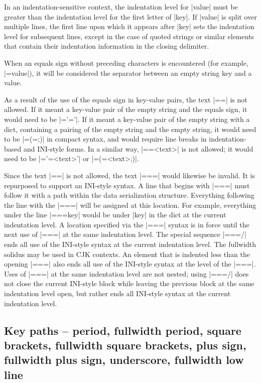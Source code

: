 \documentclass[11pt]{article}
\begin{document}
In an indentation-sensitive context, the indentation level for |value| must be greater than the indentation level for the first letter of |key|.  If |value| is split over multiple lines, the first line upon which it appears after |key| sets the indentation level for subsequent lines, except in the case of quoted strings or similar elements that contain their indentation information in the closing delimiter.

When an equals sign without preceding characters is encountered (for example, |=value|), it will be considered the separator between an empty string key and a value.  

As a result of the use of the equals sign in key-value pairs, the text |==| is not allowed.  If it meant a key-value pair of the empty string and the equals sign, it would need to be |='='|.  If it meant a key-value pair of the empty string with a dict, containing a pairing of the empty string and the empty string, it would need to be |=(=;)| in compact syntax, and would require line breaks in indentation-based and INI-style forms.  In a similar way, |==<text>| is not allowed; it would need to be |='=<text>'| or |=(=<text>;)|.

Since the text |==| is not allowed, the text |===| would likewise be invalid.  It is repurposed to support an INI-style syntax.  A line that begins with |===| must follow it with a path within the data serialization structure.  Everything following the line with the |===| will be assigned at this location.  For example, everything under the line |===key| would be under |key| in the dict at the current indentation level.  A location specified via the |===| syntax is in force until the next use of |===| at the same indentation level.  The special sequence |===/| ends all use of the INI-style syntax at the current indentation level.  The fullwidth solidus may be used in CJK contexts.  An element that is indented less than the opening |===| also ends all use of the INI-style syntax at the level of the |===|.  Uses of |===| at the same indentation level are not nested; using |===/| does not close the current INI-style block while leaving the previous block at the same indentation level open, but rather ends all INI-style syntax at the current indentation level.


\subsection{Key paths -- period, fullwidth period, square brackets, fullwidth square brackets, plus sign, fullwidth plus sign, underscore, fullwidth low line}
\end{document}
